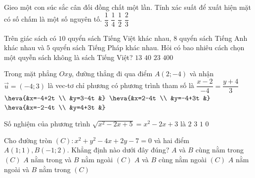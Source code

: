 \begin{ex}%
	Gieo một con súc sắc cân đối đồng chất một lần. Tính xác suất để xuất hiện mặt có số chấm là một số nguyên tố.
	\choice
	{\True $\dfrac{1}{3}$}
	{$\dfrac{1}{4}$}
	{$\dfrac{1}{2}$}
	{$\dfrac{2}{3}$}
	\loigiai{
		
	}
\end{ex}

\begin{ex}%
	Trên giác sách có $10$ quyển sách Tiếng Việt khác nhau, $8$ quyển sách Tiếng Anh khác nhau và $5$ quyển sách Tiếng Pháp khác nhau. Hỏi có bao nhiêu cách chọn một quyễn sách không là sách Tiếng Việt?
	\choice
	{\True $13$}
	{$40$}
	{$23$}
	{$400$}
	\loigiai{
	
	}
\end{ex}

\begin{ex}%
	Trong mặt phẳng $Ox y$, đường thẳng đi qua điểm $A(2;-4)$ và nhận $\vec{u}=(-4; 3)$ là vec-tơ chỉ phương có phương trình tham số là
	\choice
	{$\dfrac{x-2}{-4}=\dfrac{y+4}{3}$}
	{$\heva{&x=-4+2t \\
			&y=3-4t
			&}$}
	{\True $\heva{&x=2-4t \\
			&y=-4+3t
			&}$}
	{$\heva{&x=-2-4t \\
			&y=4+3t
			&}$}
	\loigiai{
	
	}
\end{ex}

\begin{ex}%
	Số nghiệm của phương trình $\sqrt{x^2-2x+5}=x^2-2x+3$ là
	\choice
	{$2$}
	{$3$}
	{\True $1$}
	{$0$}
	\loigiai{
	
	}
\end{ex}

\begin{ex}%
	Cho đường tròn $(C)\colon x^2+y^2-4x+2y-7=0$ và hai điểm $A(1; 1), B(-1; 2)$. Khẳng định nào dưới đây đúng?
	\choice
	{$A$ và $B$ cùng nằm trong $(C)$}
	{\True $A$ nằm trong và $B$ nằm ngoài $(C)$}
	{$A$ và $B$ cùng nằm ngoài $(C)$}
	{$A$ nằm ngoài và $B$ nằm trong $(C)$}
	\loigiai{
		
	}
\end{ex}

